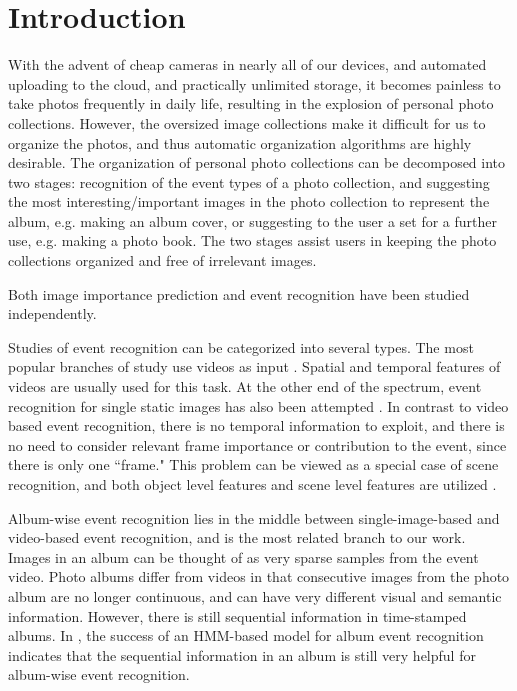 \documentclass[runningheads]{llncs}
\begin{document}
\section{Introduction}
With the advent of cheap cameras in nearly all of our devices, and automated uploading to the cloud, and practically unlimited storage,
it becomes painless to take photos frequently in daily life, resulting in the explosion of personal photo collections. However, the oversized image collections make it difficult for us to organize the photos, and thus automatic organization algorithms are highly desirable. The organization of personal photo collections can be decomposed into two stages: recognition of the event types of a photo collection, and suggesting the most interesting/important images in the photo collection to represent the album, e.g. making an album cover, or suggesting to the user a set for a further use, e.g. making a photo book. The two stages assist users in keeping the photo collections organized and free of irrelevant images.

Both image importance prediction and event recognition have been studied independently. 

Studies of event recognition can be categorized into several types. The most popular branches of study use videos as input \cite{2015trecvidover, TangCVPR12, xu2015discriminative}. Spatial and temporal features of videos are usually used for this task. 
At the other end of the spectrum, event recognition for single static images has also been attempted \cite{what_where, Park_2015_CVPR_Workshops, cSalvadora}. In contrast to video based event recognition, there is no temporal information to exploit, and there is no need to consider relevant frame importance or contribution to the event, since there is only one ``frame." This problem can be viewed as a special case of scene recognition, and both object level features and scene level features are utilized \cite{what_where}. 

Album-wise event recognition lies in the middle between single-image-based and video-based event recognition, and is the most related branch to our work. Images in an album can be thought of as very sparse samples from the event video. Photo albums differ from videos in that consecutive images from the photo album are no longer continuous, and can have very different visual and semantic information. However, there is still sequential information in time-stamped albums. In \cite{HMM}, the success of an HMM-based model for album event recognition indicates that the sequential information in an album is still very helpful for  album-wise event recognition.
\end{document}
